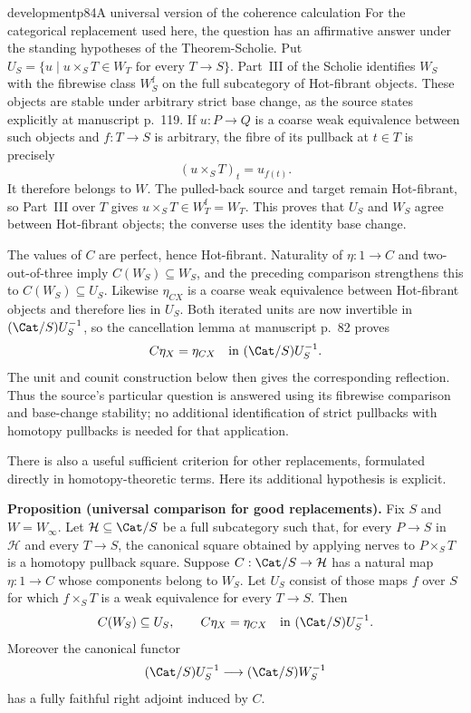 \begin{dcomment}{development}{p84}{A universal version of the coherence calculation}
For the categorical replacement used here, the question has an affirmative answer under the standing hypotheses of the Theorem-Scholie. Put $U_S=\{u\mid u\times_ST\in W_T\text{ for every }T\to S\}$. Part~III of the Scholie identifies $W_S$ with the fibrewise class $W_S^{\mathrm f}$ on the full subcategory of Hot-fibrant objects. These objects are stable under arbitrary strict base change, as the source states explicitly at manuscript p.~119. If $u:P\to Q$ is a coarse weak equivalence between such objects and $f:T\to S$ is arbitrary, the fibre of its pullback at $t\in T$ is precisely
\[
 (u\times_ST)_t=u_{f(t)}.
\]
It therefore belongs to $W$. The pulled-back source and target remain Hot-fibrant, so Part~III over $T$ gives $u\times_ST\in W_T^{\mathrm f}=W_T$. This proves that $U_S$ and $W_S$ agree between Hot-fibrant objects; the converse uses the identity base change.

The values of $C$ are perfect, hence Hot-fibrant. Naturality of $\eta:1\to C$ and two-out-of-three imply $C(W_S)\subseteq W_S$, and the preceding comparison strengthens this to $C(W_S)\subseteq U_S$. Likewise $\eta_{CX}$ is a coarse weak equivalence between Hot-fibrant objects and therefore lies in $U_S$. Both iterated units are now invertible in $(\Cat/S)U_S^{-1}$, so the cancellation lemma at manuscript p.~82 proves
\[
 C\eta_X=\eta_{CX}\quad\hbox{in }(\Cat/S)U_S^{-1}.
\]
The unit and counit construction below then gives the corresponding reflection. Thus the source's particular question is answered using its fibrewise comparison and base-change stability; no additional identification of strict pullbacks with homotopy pullbacks is needed for that application.

There is also a useful sufficient criterion for other replacements, formulated directly in homotopy-theoretic terms. Here its additional hypothesis is explicit.

\textbf{Proposition (universal comparison for good replacements).}\ours
Fix $S$ and $W=W_\infty$. Let $\mathcal H\subseteq\Cat/S$ be a full subcategory such that, for every $P\to S$ in $\mathcal H$ and every $T\to S$, the canonical square obtained by applying nerves to $P\times_ST$ is a homotopy pullback square. Suppose $C:\Cat/S\to\mathcal H$ has a natural map $\eta:1\to C$ whose components belong to $W_S$. Let $U_S$ consist of those maps $f$ over $S$ for which $f\times_ST$ is a weak equivalence for every $T\to S$. Then
\[
 C(W_S)\subseteq U_S,\qquad
 C\eta_X=\eta_{CX}\quad\hbox{in }(\Cat/S)U_S^{-1}.
\]
Moreover the canonical functor
\[
 (\Cat/S)U_S^{-1}\longrightarrow(\Cat/S)W_S^{-1}
\]
has a fully faithful right adjoint induced by $C$.


\end{dcomment}
